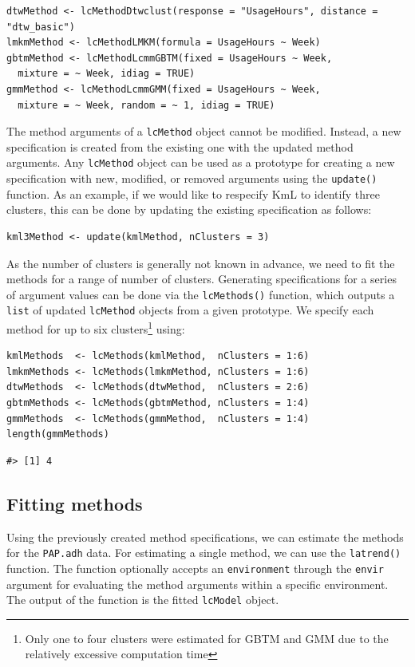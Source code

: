 \begin{verbatim}
dtwMethod <- lcMethodDtwclust(response = "UsageHours", distance = "dtw_basic")
lmkmMethod <- lcMethodLMKM(formula = UsageHours ~ Week)
gbtmMethod <- lcMethodLcmmGBTM(fixed = UsageHours ~ Week,
  mixture = ~ Week, idiag = TRUE)
gmmMethod <- lcMethodLcmmGMM(fixed = UsageHours ~ Week,
  mixture = ~ Week, random = ~ 1, idiag = TRUE)
\end{verbatim}

The method arguments of a \texttt{lcMethod} object cannot be modified. Instead, a new specification is created from the existing one with the updated method arguments. Any \texttt{lcMethod} object can be used as a prototype for creating a new specification with new, modified, or removed arguments using the \texttt{update()} function. As an example, if we would like to respecify KmL to identify three clusters, this can be done by updating the existing specification as follows:

\begin{verbatim}
kml3Method <- update(kmlMethod, nClusters = 3)
\end{verbatim}

As the number of clusters is generally not known in advance, we need to fit the methods for a range of number of clusters. Generating specifications for a series of argument values can be done via the \texttt{lcMethods()} function, which outputs a \texttt{list} of updated \texttt{lcMethod} objects from a given prototype. We specify each method for up to six clusters\footnote{Only one to four clusters were estimated for GBTM and GMM due to the relatively excessive computation time} using:

\begin{verbatim}
kmlMethods  <- lcMethods(kmlMethod,  nClusters = 1:6)
lmkmMethods <- lcMethods(lmkmMethod, nClusters = 1:6)
dtwMethods  <- lcMethods(dtwMethod,  nClusters = 2:6)
gbtmMethods <- lcMethods(gbtmMethod, nClusters = 1:4)
gmmMethods  <- lcMethods(gmmMethod,  nClusters = 1:4)
length(gmmMethods)
\end{verbatim}

\begin{verbatim}
#> [1] 4
\end{verbatim}

\subsection{Fitting methods}\label{fitting-methods}

Using the previously created method specifications, we can estimate the methods for the \texttt{PAP.adh} data. For estimating a single method, we can use the \texttt{latrend()} function. The function optionally accepts an \texttt{environment} through the \texttt{envir} argument for evaluating the method arguments within a specific environment. The output of the function is the fitted \texttt{lcModel} object.

